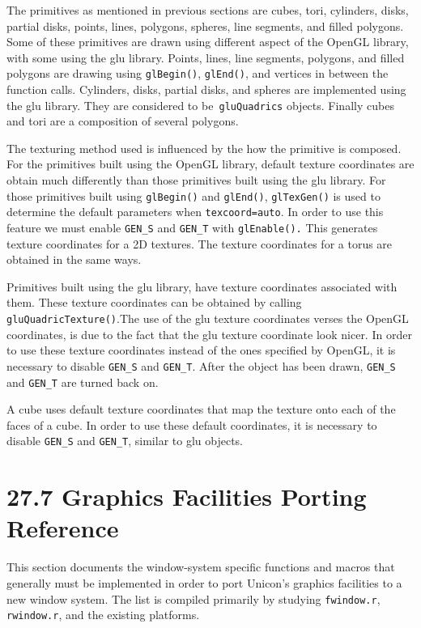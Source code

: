 The primitives as mentioned in previous sections are cubes, tori,
cylinders, disks, partial disks, points, lines, polygons, spheres,
line segments, and filled polygons. Some of these primitives are drawn
using different aspect of the OpenGL library, with some using the glu
library. Points, lines, line segments, polygons, and filled polygons
are drawing using \texttt{glBegin()}, \texttt{glEnd()}, and vertices
in between the function calls. Cylinders, disks, partial disks, and
spheres are implemented using the glu library. They are considered to
be\texttt{ gluQuadrics} objects. Finally cubes and tori are a
composition of several polygons.

The texturing method used is influenced by the how the primitive is
composed. For the primitives built using the OpenGL library, default
texture coordinates are obtain much differently than those primitives
built using the glu library. For those primitives built using
\texttt{glBegin()} and \texttt{glEnd()}, \texttt{glTexGen()} is used
to determine the default parameters when
\texttt{{\textquotedbl}texcoord=auto{\textquotedbl}}. In order to use
this feature we must enable \texttt{GEN\_S} and \texttt{GEN\_T} with
\texttt{glEnable().} This generates texture coordinates for a 2D
textures. The texture coordinates for a torus are obtained in the same
ways.

Primitives built using the glu library, have texture coordinates
associated with them. These texture coordinates can be obtained by
calling \texttt{gluQuadricTexture()}.The use of the glu texture
coordinates verses the OpenGL coordinates, is due to the fact that the
glu texture coordinate look nicer. In order to use these texture
coordinates instead of the ones specified by OpenGL, it is necessary
to disable \texttt{GEN\_S} and \texttt{GEN\_T}. After the object has
been drawn, \texttt{GEN\_S} and \texttt{GEN\_T} are turned back on.

A cube uses default texture coordinates that map the texture onto each
of the faces of a cube. In order to use these default coordinates, it
is necessary to disable \texttt{GEN\_S} and \texttt{GEN\_T}, similar
to glu objects.

\section[27.7 Graphics Facilities Porting Reference]{27.7 Graphics Facilities Porting Reference}

This section documents the window-system specific functions and macros
that generally must be implemented in order to port Unicon's graphics
facilities to a new window system. The list is compiled primarily by
studying \texttt{fwindow.r}, \texttt{rwindow.r}, and the existing
platforms.


